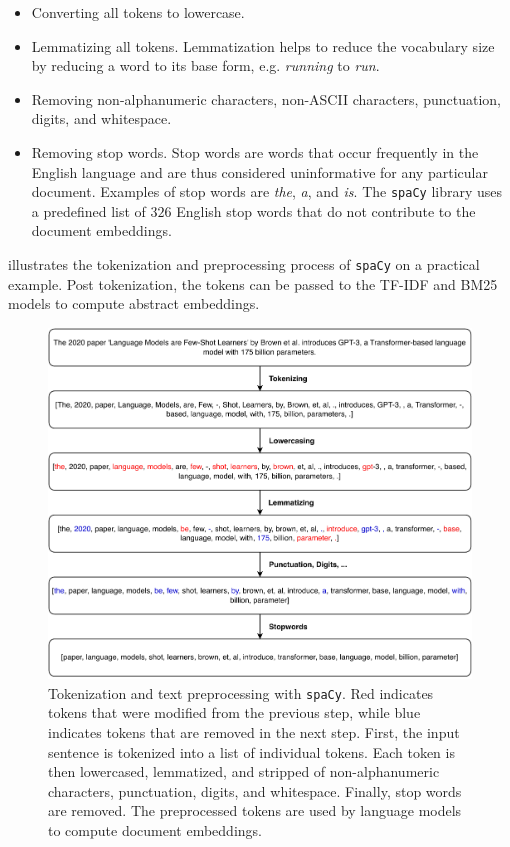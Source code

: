 \begin{itemize}
    \item Converting all tokens to lowercase.
    \item Lemmatizing all tokens. Lemmatization helps to reduce the vocabulary size by reducing a word to its base form, e.g. \emph{running} to \emph{run}.
    \item Removing non-alphanumeric characters, non-ASCII characters, punctuation, digits, and whitespace.
    \item Removing stop words.
          Stop words are words that occur frequently in the English language and are thus considered uninformative for any particular document. Examples of stop words are \emph{the}, \emph{a}, and \emph{is}.
          The \texttt{spaCy} library uses a predefined list of $326$ English stop words that do not contribute to the document embeddings.
\end{itemize}

 illustrates the tokenization and preprocessing process of \texttt{spaCy} on a practical example.
Post tokenization, the tokens can be passed to the TF-IDF and BM25 models to compute abstract embeddings.

\begin{figure}[htb!]
    \centering
    \includegraphics[width=\textwidth]{diagrams/spacy.pdf}
    \caption[Tokenization and Preprocessing]{Tokenization and text preprocessing with \texttt{spaCy}. Red indicates tokens that were modified from the previous step, while blue indicates tokens that are removed in the next step. First, the input sentence is tokenized into a list of individual tokens. Each token is then lowercased, lemmatized, and stripped of non-alphanumeric characters, punctuation, digits, and whitespace. Finally, stop words are removed. The preprocessed tokens are used by language models to compute document embeddings.
    }
    \label{fig:spacy}
\end{figure}


